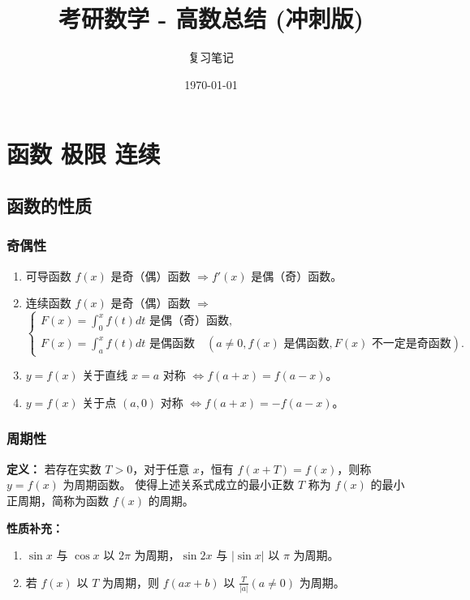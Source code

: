 \documentclass[a4paper,12pt]{ctexart} %
\title{\textbf{考研数学 - 高数总结 (冲刺版)}}
\author{复习笔记}
\date{\today}
\newenvironment{purplebox}
  {\begin{tcolorbox}[colback=white, colframe=boxpurple, boxrule=1pt, sharp corners, title=\textbf{定义/定理}]}
  {\end{tcolorbox}}
\newcommand{\zh}[1]{\par\smallskip\noindent\textbf{#1}\par\smallskip}
\begin{document}
\maketitle
\tableofcontents
\newpage

\section{函数 极限 连续}

\subsection{函数的性质}

\subsubsection{奇偶性}
\begin{enumerate}
    \item 可导函数 $f(x)$ 是奇（偶）函数 $\Rightarrow f'(x)$ 是偶（奇）函数。
    \item 连续函数 $f(x)$ 是奇（偶）函数 $\Rightarrow$
    \[
    \begin{cases}
    F(x) = \int_0^x f(t) dt \text{ 是偶（奇）函数}, \\
    F(x) = \int_a^x f(t) dt \text{ 是偶函数} \quad (a \neq 0, f(x) \text{ 是偶函数}, F(x) \text{ 不一定是奇函数}).
    \end{cases}
    \]
    \item $y = f(x)$ 关于直线 $x = a$ 对称 $\Leftrightarrow f(a+x) = f(a-x)$。
    \item $y = f(x)$ 关于点 $(a, 0)$ 对称 $\Leftrightarrow f(a+x) = -f(a-x)$。
\end{enumerate}

\subsubsection{周期性}
\begin{purplebox}
    \textbf{定义：} 若存在实数 $T > 0$，对于任意 $x$，恒有 $f(x+T) = f(x)$，则称 $y = f(x)$ 为周期函数。
    使得上述关系式成立的最小正数 $T$ 称为 $f(x)$ 的最小正周期，简称为函数 $f(x)$ 的周期。
\end{purplebox}

\zh{性质补充：}
\begin{enumerate}
    \item $\sin x$ 与 $\cos x$ 以 $2\pi$ 为周期，$\sin 2x$ 与 $|\sin x|$ 以 $\pi$ 为周期。
    \item 若 $f(x)$ 以 $T$ 为周期，则 $f(ax+b)$ 以 $\frac{T}{|a|} (a \neq 0)$ 为周期。
\end{enumerate}
\end{document}

